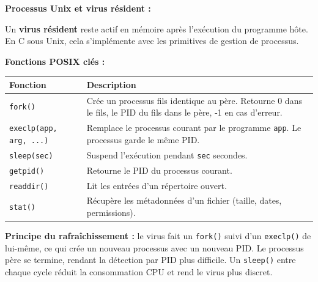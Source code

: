 \documentclass[a4paper,11pt]{article}
\theoremstyle{plain}
\theoremstyle{definition}
\begin{document}
\begin{rappel}
\textbf{Processus Unix et virus résident :}

Un \textbf{virus résident} reste actif en mémoire après l'exécution du programme hôte. En C sous Unix, cela s'implémente avec les primitives de gestion de processus.

\medskip
\textbf{Fonctions POSIX clés :}

\begin{center}
\begin{tabular}{lp{8cm}}
\toprule
\textbf{Fonction} & \textbf{Description} \\
\midrule
\texttt{fork()} & Crée un processus fils identique au père. Retourne 0 dans le fils, le PID du fils dans le père, -1 en cas d'erreur. \\
\texttt{execlp(app, arg, ...)} & Remplace le processus courant par le programme \texttt{app}. Le processus garde le même PID. \\
\texttt{sleep(sec)} & Suspend l'exécution pendant \texttt{sec} secondes. \\
\texttt{getpid()} & Retourne le PID du processus courant. \\
\texttt{readdir()} & Lit les entrées d'un répertoire ouvert. \\
\texttt{stat()} & Récupère les métadonnées d'un fichier (taille, dates, permissions). \\
\bottomrule
\end{tabular}
\end{center}

\medskip
\textbf{Principe du rafraîchissement :} le virus fait un \texttt{fork()} suivi d'un \texttt{execlp()} de lui-même, ce qui crée un nouveau processus avec un nouveau PID. Le processus père se termine, rendant la détection par PID plus difficile. Un \texttt{sleep()} entre chaque cycle réduit la consommation CPU et rend le virus plus discret.
\end{rappel}
\end{document}
